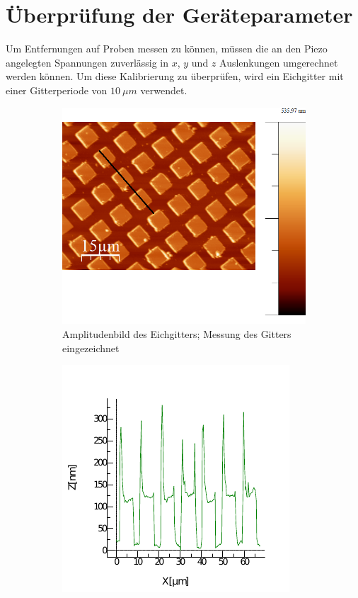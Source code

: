     \section{Überprüfung der Geräteparameter}

Um Entfernungen auf Proben messen zu können, müssen die an den Piezo angelegten 
Spannungen zuverlässig in $x$, $y$ und $z$ Auslenkungen umgerechnet werden können.
Um diese Kalibrierung zu überprüfen, wird ein Eichgitter mit einer Gitterperiode
von  $\SI{10}{\mu m}$ verwendet.
\begin{figure}
    \centering
    \begin{subfigure}[hb]{0.4\textwidth}
        \includegraphics[width=\textwidth]{Mess/gitter_paint.png}
        \caption{Amplitudenbild des Eichgitters; Messung des Gitters eingezeichnet}
        \label{gitter}
    \end{subfigure}
    \begin{subfigure}[hb]{0.4\textwidth}
        \includegraphics[width=\textwidth]{Mess/profil_gitter.pdf}

\end{subfigure}
\end{figure}
